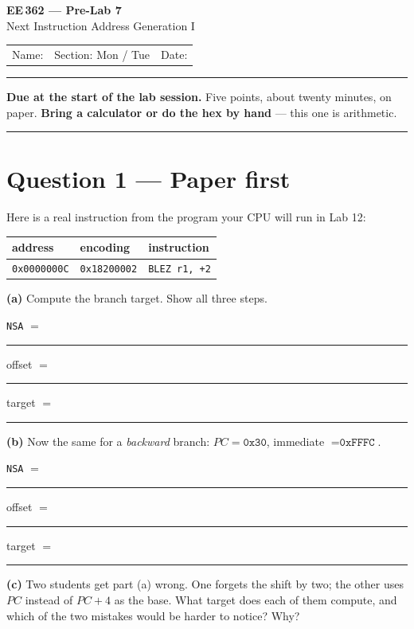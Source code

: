 \documentclass[11pt]{article}
\newcommand{\code}[1]{\texttt{#1}}
\begin{document}
\begin{center}
{\Large\bfseries EE\,362 --- Pre-Lab 7}\\[2pt]
{\large Next Instruction Address Generation I}\\[6pt]
\begin{tabular}{@{}p{6.5cm}p{4cm}p{4cm}@{}}
Name: \hrulefill & Section: Mon / Tue & Date: \hrulefill
\end{tabular}
\end{center}

\vspace{2pt}\hrule\vspace{4pt}

{\small\textbf{Due at the start of the lab session.} Five points, about twenty
minutes, on paper. \textbf{Bring a calculator or do the hex by hand} --- this
one is arithmetic.}

\vspace{4pt}\hrule

\section*{Question 1 --- Paper first}

Here is a real instruction from the program your CPU will run in Lab 12:

\begin{center}
\begin{tabular}{lll}
\toprule
address & encoding & instruction \\
\midrule
\code{0x0000000C} & \code{0x18200002} & \code{BLEZ r1, +2} \\
\bottomrule
\end{tabular}
\end{center}

\textbf{(a)} Compute the branch target. Show all three steps.

\vspace{4pt}
\code{NSA} $= $ \rule{4cm}{0.4pt} \hfill
offset $= $ \rule{4cm}{0.4pt} \hfill
target $= $ \rule{4cm}{0.4pt}
\vspace{8pt}

\textbf{(b)} Now the same for a \emph{backward} branch: $PC = \code{0x30}$,
immediate $= \code{0xFFFC}$.

\vspace{4pt}
\code{NSA} $= $ \rule{4cm}{0.4pt} \hfill
offset $= $ \rule{4cm}{0.4pt} \hfill
target $= $ \rule{4cm}{0.4pt}
\vspace{8pt}

\textbf{(c)} Two students get part (a) wrong. One forgets the shift by two; the
other uses $PC$ instead of $PC+4$ as the base. What target does each of them
compute, and which of the two mistakes would be harder to notice? Why?
\end{document}
